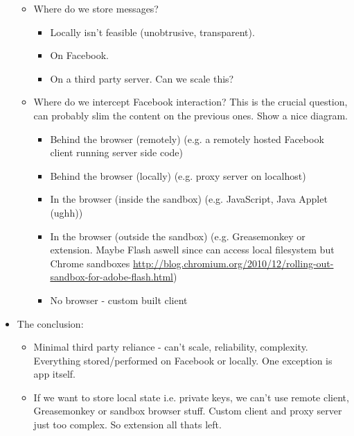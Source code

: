 \begin{itemize}
\begin{itemize}
        \item Where do we store messages?
            \begin{itemize}
                \item Locally isn't feasible (unobtrusive, transparent).
                \item On Facebook.
                \item On a third party server. Can we scale this?
            \end{itemize}
                
        \item Where do we intercept Facebook interaction? This is the crucial question, can probably slim the content on the previous ones. Show a nice diagram.
            \begin{itemize}
                \item Behind the browser (remotely) (e.g. a remotely hosted Facebook client running server side code)
                \item Behind the browser (locally) (e.g. proxy server on localhost)
                \item In the browser (inside the sandbox) (e.g. JavaScript, Java Applet (ughh))
                \item In the browser (outside the sandbox) (e.g. Greasemonkey or extension. Maybe Flash aswell since can access local filesystem but Chrome sandboxes \url{http://blog.chromium.org/2010/12/rolling-out-sandbox-for-adobe-flash.html})
                \item No browser - custom built client
            \end{itemize}
        \end{itemize}
        
	\item The conclusion:
            \begin{itemize}
                \item Minimal third party reliance - can't scale, reliability, complexity. Everything stored/performed on Facebook or locally. One exception is app itself.
                \item If we want to store local state i.e. private keys, we can't use remote client, Greasemonkey or sandbox browser stuff. Custom client and proxy server just too complex. So extension all thats left.
            \end{itemize}
         
    \end{itemize}

